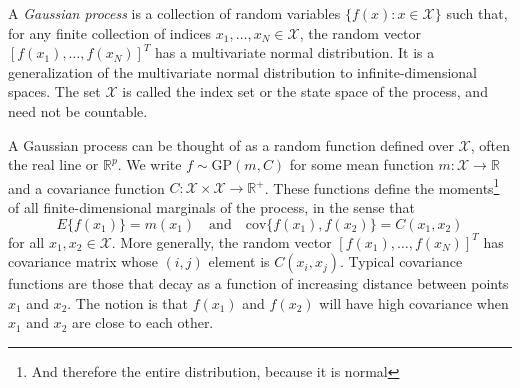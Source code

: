 \documentclass[11pt]{article}
\begin{document}
A \textit{Gaussian process} is a collection of random variables $\{f(x): x \in \mathcal{X}\}$ such that, for any finite collection of indices $x_1, \ldots, x_N \in \mathcal{X}$, the random vector $[f(x_1), \ldots, f(x_N)]^T$ has a multivariate normal distribution.  It is a generalization of the multivariate normal distribution to infinite-dimensional spaces. The set $\mathcal{X}$ is called the index set or the state space of the process, and need not be countable.

A Gaussian process can be thought of as a random function defined over $\mathcal{X}$, often the real line or $\mathbb{R}^p$.  We write $f \sim \mbox{GP}(m, C)$ for some mean function $m: \mathcal{X} \rightarrow \mathbb{R}$ and a covariance function $C: \mathcal{X} \times \mathcal{X} \rightarrow \mathbb{R}^+$.  These functions define the moments\footnote{And therefore the entire distribution, because it is normal} of all finite-dimensional marginals of the process, in the sense that
$$
E\{ f(x_1) \} = m(x_1) \quad \mbox{and} \quad \mbox{cov}\{f(x_1), f(x_2) \} = C(x_1, x_2)
$$
for all $x_1, x_2 \in \mathcal{X}$.  More generally, the random vector $[f(x_1), \ldots, f(x_N)]^T$ has covariance matrix whose $(i,j)$ element is $C(x_i, x_j)$.  Typical covariance functions are those that decay as a function of increasing distance between points $x_1$ and $x_2$.  The notion is that $f(x_1)$ and $f(x_2)$ will have high covariance when $x_1$ and $x_2$ are close to each other.
\end{document}
